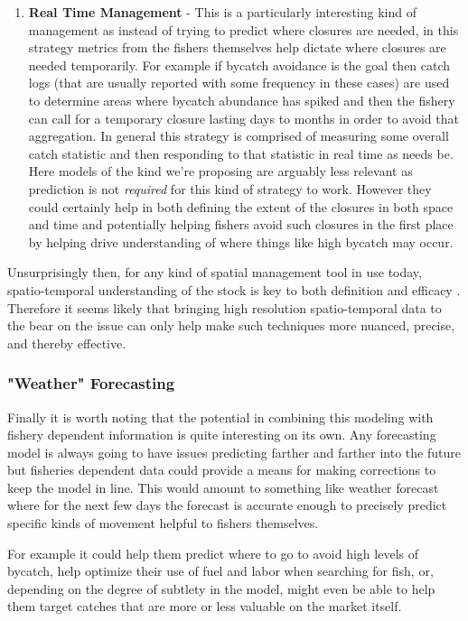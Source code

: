 \documentclass[11pt]{article}
\begin{document}
\begin{enumerate}
\item \textbf{Real Time Management} - This is a particularly interesting kind of management as instead of trying to predict where closures are needed, in this strategy metrics from the fishers themselves help dictate where closures are needed temporarily. For example if bycatch avoidance is the goal then catch logs (that are usually reported with some frequency in these cases) are used to determine areas where bycatch abundance has spiked and then the fishery can call for a temporary closure lasting days to months in order to avoid that aggregation. In general this strategy is comprised of measuring some overall catch statistic and then responding to that statistic in real time as needs be. Here models of the kind we're proposing are arguably less relevant as prediction is not \textit{required} for this kind of strategy to work. However they could certainly help in both defining the extent of the closures in both space and time and potentially helping fishers avoid such closures in the first place by helping drive understanding of where things like high bycatch may occur. 
\end{enumerate}

Unsurprisingly then, for any kind of spatial management tool in use today, spatio-temporal understanding of the stock is key to both definition and efficacy \citep{selig2016} \citep{little2014}. Therefore it seems likely that bringing high resolution spatio-temporal data to the bear on the issue can only help make such techniques more nuanced, precise, and thereby effective. 

\subsubsection{"Weather" Forecasting}

Finally it is worth noting that the potential in combining this modeling with fishery dependent information is quite interesting on its own. Any forecasting model is always going to have issues predicting farther and farther into the future but fisheries dependent data could provide a means for making corrections to keep the model in line. This would amount to something like weather forecast where for the next few days the forecast is accurate enough to precisely predict specific kinds of movement helpful to fishers themselves. 

For example it could help them predict where to go to avoid high levels of bycatch, help optimize their use of fuel and labor when searching for fish, or, depending on the degree of subtlety in the model, might even be able to help them target catches that are more or less valuable on the market itself. 
\end{document}
